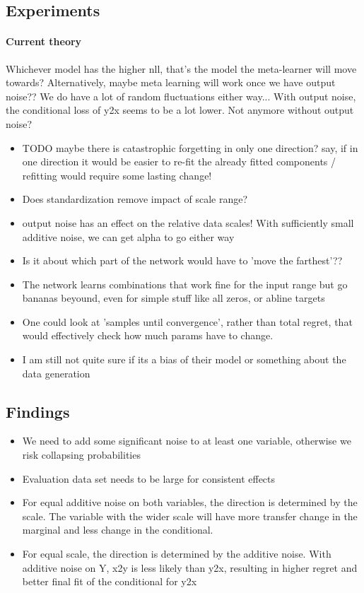 \documentclass{article}
\begin{document}
\subsection{Experiments}
\paragraph{Current theory}
Whichever model has the higher nll, that's the model the meta-learner will move towards?
Alternatively, maybe meta learning will work once we have output noise??
We do have a lot of random fluctuations either way...
With output noise, the conditional loss of y2x seems to be a lot lower. Not anymore without output noise?
\begin{itemize}
    \item TODO maybe there is catastrophic forgetting in only one direction? say, if in one direction it would be easier to re-fit the already fitted components / refitting would require some lasting change!
    \item Does standardization remove impact of scale range?
    \item output noise has an effect on the relative data scales! With sufficiently small additive noise, we can get alpha to go either way
    \item Is it about which part of the network would have to 'move the farthest'??
    \item The network learns combinations that work fine for the input range but go bananas beyound, even for simple stuff like all zeros, or abline targets
    \item One could look at 'samples until convergence', rather than total regret, that would effectively check how much params have to change.
    \item I am still not quite sure if its a bias of their model or something about the data generation
\end{itemize}

\clearpage
\subsection{Findings}
\begin{itemize}
    \item We need to add some significant noise to at least one variable, otherwise we risk collapsing probabilities
    \item Evaluation data set needs to be large for consistent effects
    \item For equal additive noise on both variables, the direction is determined by the scale. The variable with the wider scale will have more transfer change in the marginal and less change in the conditional.
    \item For equal scale, the direction is determined by the additive noise. With additive noise on Y, x2y is less likely than y2x, resulting in higher regret and better final fit of the conditional for y2x
\end{itemize}
\end{document}
